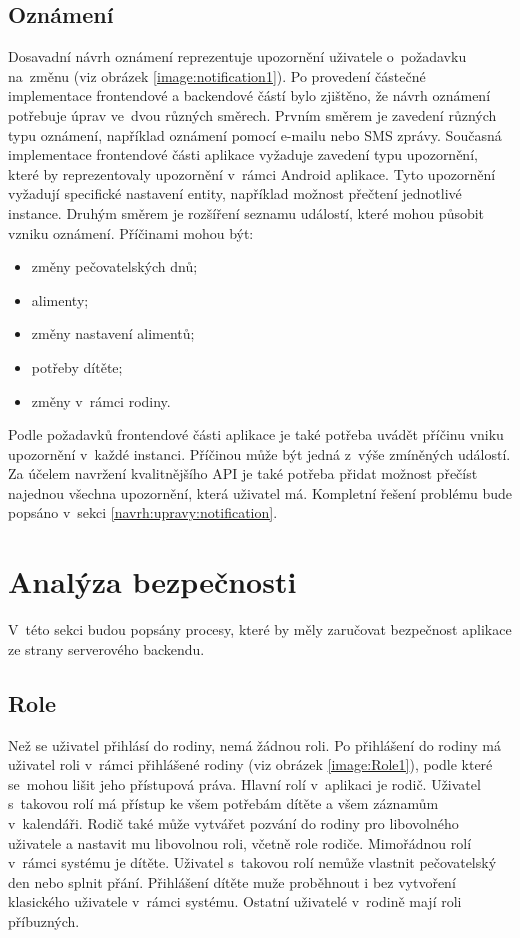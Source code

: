      \subsection{Oznámení}
        Dosavadní návrh oznámení reprezentuje upozornění uživatele o~požadavku na~změnu (viz obrázek \ref{image:notification1}). Po provedení částečné implementace frontendové a backendové částí bylo zjištěno, že návrh oznámení potřebuje úprav ve~dvou různých směrech. Prvním směrem je zavedení různých typu oznámení, například oznámení pomocí e-mailu nebo SMS zprávy. Současná implementace frontendové části aplikace vyžaduje zavedení typu upozornění, které by reprezentovaly upozornění v~rámci Android aplikace. 
        Tyto upozornění vyžadují specifické nastavení entity, například možnost přečtení jednotlivé instance. Druhým směrem je rozšíření seznamu událostí, které mohou působit vzniku oznámení. Příčinami mohou být:
        \begin{itemize}
            \item změny pečovatelských dnů;
            \item alimenty;
            \item změny nastavení alimentů;
            \item potřeby dítěte;
            \item změny v~rámci rodiny.
        \end{itemize}
        Podle požadavků frontendové části aplikace je také potřeba uvádět příčinu vniku upozornění v~každé instanci. Příčinou může být jedná z~výše zmíněných událostí. Za účelem navržení kvalitnějšího API je také potřeba přidat možnost přečíst najednou všechna upozornění, která uživatel má. Kompletní řešení problému bude popsáno v~sekci \ref{navrh:upravy:notification}.

\section{Analýza bezpečnosti}
    V~této sekci budou popsány procesy, které by měly zaručovat bezpečnost aplikace ze strany serverového backendu.
    
    \subsection{Role}\label{analyza:bezpecnost:role}
    
        Než se uživatel přihlásí do rodiny, nemá žádnou roli. Po přihlášení do rodiny má uživatel roli v~rámci přihlášené rodiny (viz obrázek \ref{image:Role1}), podle které se~mohou lišit jeho přístupová práva. Hlavní rolí v~aplikaci je rodič. Uživatel s~takovou rolí má přístup ke všem potřebám dítěte a všem záznamům v~kalendáři. Rodič také může vytvářet pozvání do rodiny pro libovolného uživatele a nastavit mu libovolnou roli, včetně role rodiče. Mimořádnou rolí v~rámci systému je dítěte. 
        Uživatel s~takovou rolí nemůže vlastnit pečovatelský den nebo splnit přání. Přihlášení dítěte muže proběhnout i bez vytvoření klasického uživatele v~rámci systému. Ostatní uživatelé v~rodině mají roli příbuzných. 
    
